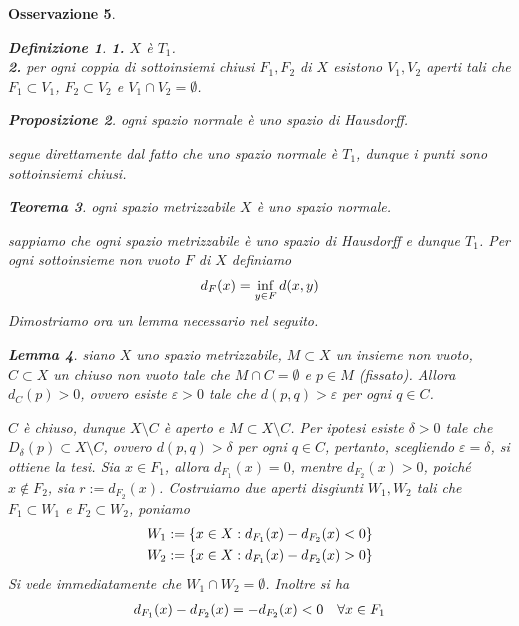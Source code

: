 \documentclass[oneside, 11pt]{amsbook}
\makeatletter
\newcommand{\0}{{(0)}}
\newcommand{\3}{{(3)}}
\theoremstyle{colonplain}
\newtheorem{thm}{Teorema}[chapter]
\newtheorem{prop}[thm]{Proposizione}
\newtheorem{lemma}[thm]{Lemma}
\theoremstyle{colondefinition}
\newtheorem{defn}[thm]{Definizione}
\theoremstyle{colonremark}
\newtheorem{rmk}[thm]{Osservazione}
\numberwithin{equation}{chapter}
\renewcommand{\proofname}{Dimostrazione}
\renewenvironment{proof}[1][\proofname]{\par
  \pushQED{\end{proof}}%
  \normalfont \topsep6\p@\@plus6\p@\relax
  \trivlist
  \item[\hskip\labelsep\bfseries #1:]\ignorespaces
}{%
  \popQED\endtrivlist\@endpefalse
}
\makeatother
\begin{document}
\begin{rmk}
\begin{defn}
\textbf{1.} $X$ è $T_1$. \\
\textbf{2.} per ogni coppia di sottoinsiemi chiusi $F_1, F_2$ di $X$ esistono $V_1, V_2$ aperti tali che $F_1 \subset V_1$, $F_2 \subset V_2$ e $V_1 \cap V_2 = \emptyset$.
\end{defn}
\begin{prop}
ogni spazio normale è uno spazio di Hausdorff.
\end{prop}
\begin{proof}
segue direttamente dal fatto che uno spazio normale è $T_1$, dunque i punti sono sottoinsiemi chiusi.
\end{proof}
\begin{thm}
ogni spazio metrizzabile $X$ è uno spazio normale.
\end{thm}
\begin{proof}
sappiamo che ogni spazio metrizzabile è uno spazio di Hausdorff e dunque $T_1$. Per ogni sottoinsieme non vuoto $F$ di $X$ definiamo
\begin{align}
    d_F(x) = \inf_{y \in F} d(x, y) \notag
\end{align}
Dimostriamo ora un lemma necessario nel seguito.
\begin{lemma}
siano $X$ uno spazio metrizzabile, $M \subset X$ un insieme non vuoto, $C \subset X$ un chiuso non vuoto tale che $M \cap C = \emptyset$ e $p \in M$ (fissato). Allora $d_C(p) > 0$, ovvero esiste $\varepsilon > 0$ tale che $d(p, q) > \varepsilon$ per ogni $q \in C$.
\end{lemma}
\begin{proof}
$C$ è chiuso, dunque $X \setminus C$ è aperto e $M \subset X \setminus C$. Per ipotesi esiste $\delta > 0$ tale che $D_\delta (p) \subset X \setminus C$, ovvero $d(p, q) > \delta$ per ogni $q \in C$, pertanto, scegliendo $\varepsilon = \delta$, si ottiene la tesi.
\end{proof}
Sia $x \in F_1$, allora $d_{F_1}(x) = 0$, mentre $d_{F_2}(x) > 0$, poiché $x \not\in F_2$, sia $r := d_{F_2}(x)$. Costruiamo due aperti disgiunti $W_1, W_2$ tali che $F_1 \subset W_1$ e $F_2 \subset W_2$, poniamo
\begin{align}
    W_1 := \{ x \in X : d_{F_1}(x) - d_{F_2}(x) < 0 \} \notag \\
    W_2 := \{ x \in X : d_{F_1}(x) - d_{F_2}(x) > 0 \} \notag
\end{align}
Si vede immediatamente che $W_1 \cap W_2 = \emptyset$. Inoltre si ha
\begin{align}
    d_{F_1}(x) - d_{F_2}(x) = -d_{F_2}(x) < 0 \quad \forall x \in F_1 \notag

\end{align}
\end{proof}
\end{rmk}
\end{document}
